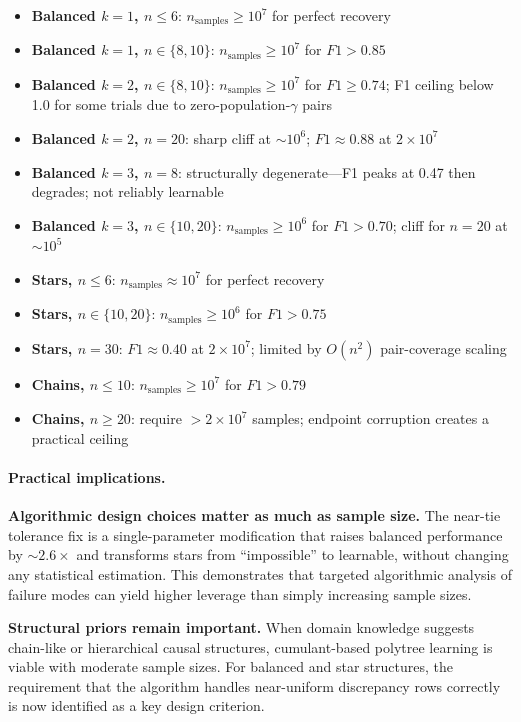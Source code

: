 \documentclass[11pt,a4paper]{article}
\numberwithin{equation}{section}
\begin{document}
\begin{itemize}
\item \textbf{Balanced $k=1$, $n \leq 6$}: $n_{\text{samples}} \geq 10^7$ for perfect recovery
\item \textbf{Balanced $k=1$, $n \in \{8, 10\}$}: $n_{\text{samples}} \geq 10^7$ for $F1 > 0.85$
\item \textbf{Balanced $k=2$, $n \in \{8, 10\}$}: $n_{\text{samples}} \geq 10^7$ for $F1 \geq 0.74$; F1 ceiling below 1.0 for some trials due to zero-population-$\gamma$ pairs
\item \textbf{Balanced $k=2$, $n=20$}: sharp cliff at ${\sim}10^6$; $F1 \approx 0.88$ at $2 \times 10^7$
\item \textbf{Balanced $k=3$, $n=8$}: structurally degenerate---F1 peaks at 0.47 then degrades; not reliably learnable
\item \textbf{Balanced $k=3$, $n \in \{10, 20\}$}: $n_{\text{samples}} \geq 10^6$ for $F1 > 0.70$; cliff for $n=20$ at ${\sim}10^5$
\item \textbf{Stars, $n \leq 6$}: $n_{\text{samples}} \approx 10^7$ for perfect recovery
\item \textbf{Stars, $n \in \{10, 20\}$}: $n_{\text{samples}} \geq 10^6$ for $F1 > 0.75$
\item \textbf{Stars, $n = 30$}: $F1 \approx 0.40$ at $2 \times 10^7$; limited by $O(n^2)$ pair-coverage scaling
\item \textbf{Chains, $n \leq 10$}: $n_{\text{samples}} \geq 10^7$ for $F1 > 0.79$
\item \textbf{Chains, $n \geq 20$}: require $> 2 \times 10^7$ samples; endpoint corruption creates a practical ceiling
\end{itemize}

\paragraph{Practical implications.}

\textbf{Algorithmic design choices matter as much as sample size.}  The near-tie
tolerance fix is a single-parameter modification that raises balanced performance by
${\sim}2.6\times$ and transforms stars from ``impossible'' to learnable, without
changing any statistical estimation.  This demonstrates that targeted algorithmic
analysis of failure modes can yield higher leverage than simply increasing sample sizes.

\textbf{Structural priors remain important.}  When domain knowledge suggests chain-like
or hierarchical causal structures, cumulant-based polytree learning is viable with
moderate sample sizes.  For balanced and star structures, the requirement that the
algorithm handles near-uniform discrepancy rows correctly is now identified as a key
design criterion.
\end{document}
